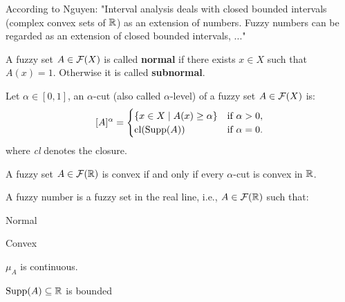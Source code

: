 According to Nguyen: "Interval analysis deals with closed bounded intervals (complex convex sets of $\mathbb{R}$) as an extension of numbers. Fuzzy numbers can be regarded as an extension of closed bounded intervals, ..." 


\begin{definition}
    A fuzzy set $A\in \mathcal{F}(X)$ is called \textbf{normal} if there exists $x\in X$ such that $A(x)=1$. Otherwise it is called \textbf{subnormal}.
\end{definition}

\begin{definition}
    Let $\alpha \in [0,1]$, an $\alpha$-cut (also called $\alpha$-level) of a fuzzy set \( A \in \mathcal{F}(X)\) is:
    \[
    [A]^\alpha =
    \begin{cases}
    \{x \in X \mid A(x)\geq \alpha\} & \text{if } \alpha > 0, \\
    \textnormal{cl}(\textnormal{Supp}(A)) & \text{if } \alpha = 0.
    \end{cases}
    \]
    where \textit{cl} denotes the closure.
\end{definition}

\begin{definition}[Convexity] A fuzzy set $A\in \mathcal{F}(\mathbb{R})$ is convex if and only if every $\alpha$-cut is convex in $\mathbb{R}$.
    
\end{definition}

\begin{definition}
    A fuzzy number is a fuzzy set in the real line, i.e., $A\in \mathcal{F}(\mathbb{R})$ such that:\vspace{-0.9em}
    \begin{romanenum}
        \item Normal\vspace{-0.5em}
        \item Convex\vspace{-0.5em}
        \item $\mu_A$ is continuous.\vspace{-0.5em}
        \item $\textnormal{Supp}(A)\subseteq\mathbb{R}$ is bounded
    \end{romanenum}
    
\end{definition}

